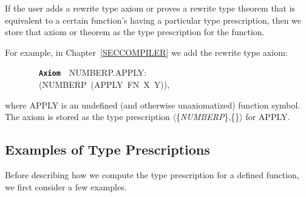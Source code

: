 \documentclass[11pt]{book}
\newenvironment{pubasis}{\begin{flushleft}\ttfamily\small}{\normalsize\rmfamily\end{flushleft}}
\newcommand{\axiomordefinition}[1]{\vspace{6pt}\texttt{\textbf{#1}}}
\newcommand{\pubinlineunderline}[1]{\emph{#1}}
\newcommand{\pubdefaulttextsize}{\large}
\begin{document}
If the user adds a rewrite type axiom or proves a rewrite type theorem
that is equivalent to a certain function's having a particular type
prescription, then we store that axiom or theorem as the type prescription
for the function.

For example, in Chapter~\ref{SECCOMPILER} we add the rewrite type axiom:
\begin{pubasis}
~~~~~~~~\axiomordefinition{Axiom}~~NUMBERP.APPLY:\\
~~~~~~~~(NUMBERP~(APPLY~FN~X~Y)),\\
\end{pubasis}
where APPLY is an undefined (and otherwise unaxiomatized) function
symbol.  The axiom is stored as the type prescription $\langle$\{\pubinlineunderline{NUMBERP}\},\{\}$\rangle$
for APPLY.
\subsection{Examples of Type Prescriptions}
\pubdefaulttextsize
Before describing how we compute the type prescription
for a defined function, we first consider a few examples.
\end{document}
